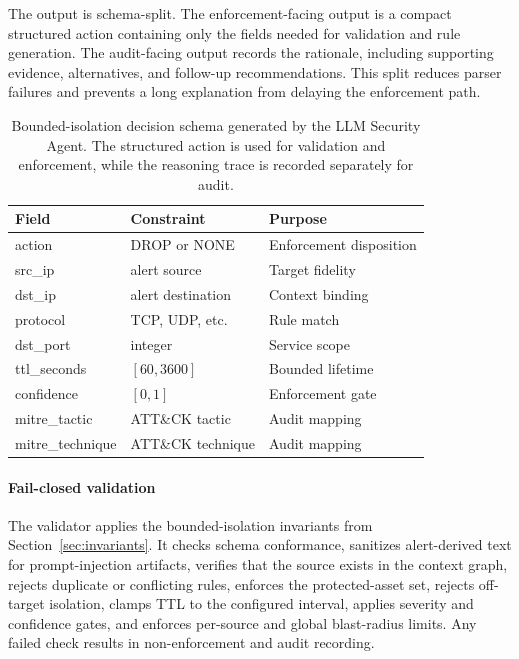 \documentclass[final,5p]{elsarticle}
\begin{document}
The output is schema-split. The enforcement-facing output is a compact structured action containing only the fields needed for validation and rule generation. The audit-facing output records the rationale, including supporting evidence, alternatives, and follow-up recommendations. This split reduces parser failures and prevents a long explanation from delaying the enforcement path.

\begin{table}[tbp]
    \centering
    \caption{Bounded-isolation decision schema generated by the LLM Security Agent. The structured action is used for validation and enforcement, while the reasoning trace is recorded separately for audit.}
    \label{tab:decision_schema}
    \small
    \begin{tabular}{@{}lll@{}}
        \toprule
        \textbf{Field} & \textbf{Constraint} & \textbf{Purpose} \\
        \midrule
        action & DROP or NONE & Enforcement disposition \\
        src\_ip & alert source & Target fidelity \\
        dst\_ip & alert destination & Context binding \\
        protocol & TCP, UDP, etc. & Rule match \\
        dst\_port & integer & Service scope \\
        ttl\_seconds & $[60,3600]$ & Bounded lifetime \\
        confidence & $[0,1]$ & Enforcement gate \\
        mitre\_tactic & ATT\&CK tactic & Audit mapping \\
        mitre\_technique & ATT\&CK technique & Audit mapping \\
        \bottomrule
    \end{tabular}
\end{table}

\paragraph{Fail-closed validation}
The validator applies the bounded-isolation invariants from Section~\ref{sec:invariants}. It checks schema conformance, sanitizes alert-derived text for prompt-injection artifacts, verifies that the source exists in the context graph, rejects duplicate or conflicting rules, enforces the protected-asset set, rejects off-target isolation, clamps TTL to the configured interval, applies severity and confidence gates, and enforces per-source and global blast-radius limits. Any failed check results in non-enforcement and audit recording.
\end{document}

